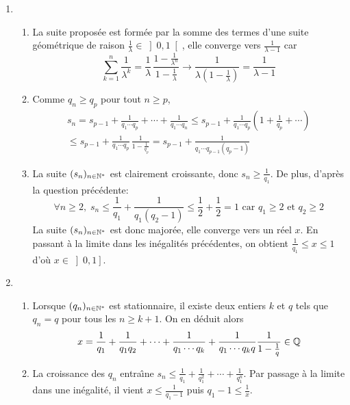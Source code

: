 \begin{enumerate}
\item 
\begin{enumerate}
  \item La suite propos{\'e}e est form{\'e}e par la somme des termes d'une suite g{\'e}om{\'e}trique de raison $\frac{1}{\lambda }\in \left]0,1\right[ $, elle converge vers $\frac{1}{\lambda -1}$ car
\[\sum_{k=1}^{n}\frac{1}{\lambda^k}=\frac{1}{\lambda}\,\frac{1-\frac{1}{\lambda^n}}{1-\frac{1}{\lambda}}\longrightarrow \frac{1}{\lambda(1-\frac{1}{\lambda})}=\frac{1}{\lambda -1}\]

  \item Comme $q_n \geq q_p$ pour tout $n\geq p$,
\begin{multline*}
s_n = s_{p-1} + \frac{1}{q_1\cdots q_p} + \cdots + \frac{1}{q_1\cdots q_n } 
\leq s_{p-1} + \frac{1}{q_1\cdots q_p}\left(1+\frac{1}{q_p} + \cdots \right) \\
\leq s_{p-1} + \frac{1}{q_1\cdots q_p}\, \frac{1}{1-\frac{1}{q_p}} 
=  s_{p-1} + \frac{1}{q_1\cdots q_{p-1}(q_p -1)}
\end{multline*}

  \item La suite $(s_{n})_{n\in \mathbb{N}^{*}}$ est clairement croissante, donc $s_{n}\geq \frac{1}{q_{1}}$. De plus, d'après la question précédente:
\begin{displaymath}
\forall n \geq2, \; s_n \leq \frac{1}{q_1} + \frac{1}{q_1(q_2-1)} \leq \frac{1}{2} + \frac{1}{2}= 1 \text{ car } q_1\geq 2 \text{ et } q_2 \geq 2 
\end{displaymath}
La suite $(s_{n})_{n\in \mathbb{N}^{*}}$ est donc major{\'e}e, elle converge vers un r{\'e}el $x$. En passant {\`a} la limite dans les in{\'e}galit{\'e}s pr{\'e}c{\'e}dentes, on obtient $\frac{1}{q_{1}}\leq x\leq 1$ d'o{\`u} $x\in \left] 0,1\right] $.

\end{enumerate}

\item \begin{enumerate}
\item Lorsque $(q_{n})_{n\in \mathbb{N}^{*}}$ est stationnaire, il existe deux entiers $k$ et $q$ tels que $q_{n}=q$ pour tous les $n\geq k+1$. On en d{\'e}duit alors
\[
x=\frac{1}{q_{1}}+\frac{1}{q_{1}q_{2}}+\cdots +\frac{1}{q_{1}\cdots q_{k}}+\frac{1}{q_{1}\cdots q_{k}q}\frac{1}{1-\frac{1}{q}}\in \mathbb{Q}
\]
\item La croissance des $q_{n}$ entra\^{\i }ne $s_{n}\leq \frac{1}{q_{1}}+\frac{1}{q_{1}^{2}}+\cdots +\frac{1}{q_{1}^{n}}$. Par passage {\`a} la limite dans une in{\'e}galit{\'e}, il vient $x\leq \frac{1}{q_{1}-1}$ puis $q_{1}-1\leq \frac{1}{x}$.


\end{enumerate}
\end{enumerate}
